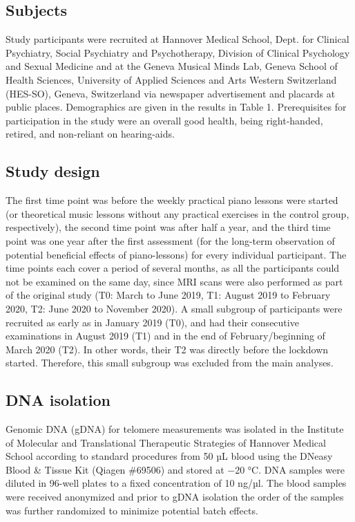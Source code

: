 \documentclass[
]{agujournal2019}
\begin{document}
\subsection{Subjects}\label{subjects}

Study participants were recruited at Hannover Medical School, Dept. for
Clinical Psychiatry, Social Psychiatry and Psychotherapy, Division of
Clinical Psychology and Sexual Medicine and at the Geneva Musical Minds
Lab, Geneva School of Health Sciences, University of Applied Sciences
and Arts Western Switzerland (HES-SO), Geneva, Switzerland via newspaper
advertisement and placards at public places. Demographics are given in
the results in Table 1. Prerequisites for participation in the study
were an overall good health, being right-handed, retired, and
non-reliant on hearing-aids.

\subsection{Study design}\label{study-design}

The first time point was before the weekly practical piano lessons were
started (or theoretical music lessons without any practical exercises in
the control group, respectively), the second time point was after half a
year, and the third time point was one year after the first assessment
(for the long-term observation of potential beneficial effects of
piano-lessons) for every individual participant. The time points each
cover a period of several months, as all the participants could not be
examined on the same day, since MRI scans were also performed as part of
the original study (T0: March to June 2019, T1: August 2019 to February
2020, T2: June 2020 to November 2020). A small subgroup of participants
were recruited as early as in January 2019 (T0), and had their
consecutive examinations in August 2019 (T1) and in the end of
February/beginning of March 2020 (T2). In other words, their T2 was
directly before the lockdown started. Therefore, this small subgroup was
excluded from the main analyses.

\subsection{DNA isolation}\label{dna-isolation}

Genomic DNA (gDNA) for telomere measurements was isolated in the
Institute of Molecular and Translational Therapeutic Strategies of
Hannover Medical School according to standard procedures from 50 µL
blood using the DNeasy Blood \& Tissue Kit (Qiagen \#69506) and stored
at −20 °C. DNA samples were diluted in 96-well plates to a fixed
concentration of 10 ng/µl. The blood samples were received anonymized
and prior to gDNA isolation the order of the samples was further
randomized to minimize potential batch effects.
\end{document}
